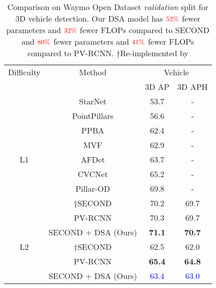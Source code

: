 \documentclass[10pt,twocolumn,letterpaper]{article}
\begin{document}
\begin{table}[t]
\footnotesize
\begin{center}
\begin{tabular}{c||c||c|c}
\hline 
Difficulty  & Method & \multicolumn{2}{c}{Vehicle} \\
\cline{3-4}
 &   &  3D AP & 3D APH \\
\hline
& StarNet \cite{starnet} & 53.7 & - \\
& PointPillars \cite{pointpillars} & 56.6 & -  \\
& PPBA \cite{ppba} & 62.4 & -  \\
& MVF \cite{MV3D} & 62.9 & -  \\
L1 & AFDet \cite{afdet} & 63.7 & -  \\
& CVCNet \cite{cvcnet} & 65.2 & -  \\
& Pillar-OD \cite{pillar-od} & 69.8 & -  \\
& $\dagger$SECOND \cite{SECOND} & 70.2 & 69.7 \\
& PV-RCNN \cite{PVRCNN} & 70.3 & 69.7 \\ 
& SECOND + DSA (Ours) & \textbf{71.1} & \textbf{70.7} \\

\hline
L2 & $\dagger$SECOND \cite{SECOND} & 62.5 & 62.0 \\
& PV-RCNN \cite{PVRCNN} & \textbf{65.4} & \textbf{64.8} \\
& SECOND + DSA (Ours) & \textcolor{blue}{63.4} & \textcolor{blue}{63.0} \\
\hline
\end{tabular}
\end{center}
\vspace{-0.2cm}
\caption{Comparison on Waymo Open Dataset \textit{validation} split for 3D vehicle detection. Our DSA model has $\textcolor{red}{52\%}$ fewer parameters and $\textcolor{red}{32\%}$ fewer FLOPs compared to SECOND and $\textcolor{red}{80\%}$ fewer parameters and $\textcolor{red}{41\%}$ fewer FLOPs compared to PV-RCNN. $\dagger$Re-implemented by \cite{OpenPCDet}}
\label{tab:waymo_val}
\vspace{-0.5 cm}
\end{table} 
\end{document}
